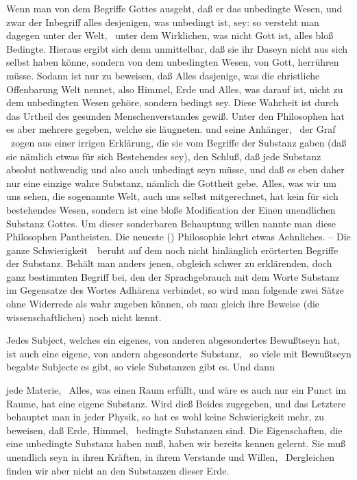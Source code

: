\begin{aufza}
\item Wenn man von dem Begriffe Gottes ausgeht, daß er das unbedingte Wesen, und zwar der Inbegriff alles desjenigen, was unbedingt ist, sey: so versteht man dagegen unter der Welt, \dh\ unter dem Wirklichen, was nicht Gott ist, alles bloß Bedingte. Hieraus ergibt sich denn unmittelbar, daß sie ihr Daseyn nicht aus sich selbst haben könne, sondern von dem unbedingten Wesen, von Gott, herrühren müsse. Sodann ist nur zu beweisen, daß Alles dasjenige, was die christliche Offenbarung Welt nennet, also Himmel, Erde und Alles, was darauf ist, nicht zu dem unbedingten Wesen gehöre, sondern bedingt sey. Diese Wahrheit ist durch das Urtheil des gesunden Menschenverstandes gewiß. Unter den Philosophen hat es aber mehrere gegeben, welche sie läugneten.  und seine Anhänger, \zB\ der Graf  \uA\ zogen aus einer irrigen Erklärung, die sie vom Begriffe der Substanz gaben (daß sie nämlich etwas für sich Bestehendes sey), den Schluß, daß jede Substanz absolut nothwendig und also auch unbedingt seyn müsse, und daß es eben daher nur eine einzige wahre Substanz, nämlich die Gottheit gebe. Alles, was wir um uns sehen, die sogenannte Welt, auch uns selbst mitgerechnet, hat kein für sich bestehendes Wesen, sondern ist eine bloße Modification der Einen unendlichen Substanz Gottes. Um dieser sonderbaren Behauptung willen nannte man diese Philosophen Pantheisten. Die neueste () Philosophie lehrt etwas Aehnliches. -- Die ganze Schwierigkeit~\ beruht auf dem noch nicht hinlänglich erörterten Begriffe der Substanz. Behält man anders jenen, obgleich schwer zu erklärenden, doch ganz bestimmten Begriff bei, den der Sprachgebrauch mit dem Worte Substanz im Gegensatze des Wortes Adhärenz verbindet, so wird man folgende zwei Sätze ohne Widerrede als wahr zugeben können, ob man gleich ihre Beweise (die wissenschaftlichen) noch nicht kennt.
\begin{aufzb}
\item Jedes Subject, welches ein eigenes, von anderen abgesondertes Bewußtseyn hat, ist auch eine eigene, von andern abgesonderte Substanz, \dh\ so viele mit Bewußtseyn begabte Subjecte es gibt, so viele Substanzen gibt es. Und dann
\item jede Materie, \dh\ Alles, was einen Raum erfüllt, und wäre es auch nur ein Punct im Raume, hat eine eigene Substanz. Wird dieß Beides zugegeben, und das Letztere behauptet man in jeder Physik, so hat es wohl keine Schwierigkeit mehr, zu beweisen, daß Erde, Himmel, \usw\ bedingte Substanzen sind. Die Eigenschaften, die eine unbedingte Substanz haben muß, haben wir bereits kennen gelernt. Sie muß unendlich seyn in ihren Kräften, in ihrem Verstande und Willen, \usw\ Dergleichen finden wir aber nicht an den Substanzen dieser Erde.

\end{aufzb}
\end{aufza}
